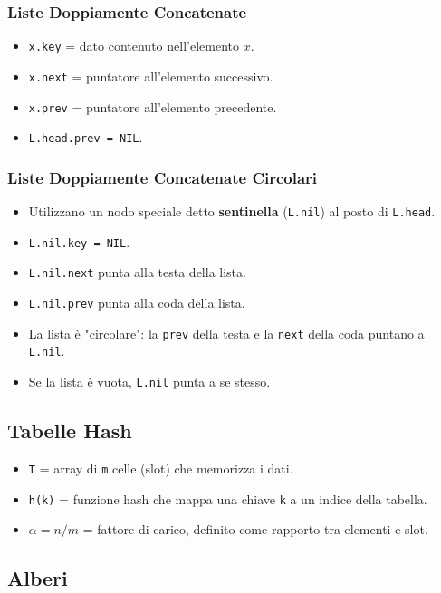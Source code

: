 \subsubsection{Liste Doppiamente Concatenate}
\begin{itemize}
    \item \texttt{x.key} = dato contenuto nell'elemento $x$.
    \item \texttt{x.next} = puntatore all'elemento successivo.
    \item \texttt{x.prev} = puntatore all'elemento precedente.
    \item \texttt{L.head.prev = NIL}.
\end{itemize}

\subsubsection{Liste Doppiamente Concatenate Circolari}
\begin{itemize}
    \item Utilizzano un nodo speciale detto \textbf{sentinella} (\texttt{L.nil}) al posto di \texttt{L.head}.
    \item \texttt{L.nil.key = NIL}.
    \item \texttt{L.nil.next} punta alla testa della lista.
    \item \texttt{L.nil.prev} punta alla coda della lista.
    \item La lista è "circolare": la \texttt{prev} della testa e la \texttt{next} della coda puntano a \texttt{L.nil}.
    \item Se la lista è vuota, \texttt{L.nil} punta a se stesso.
\end{itemize}

\subsection{Tabelle Hash}
\begin{itemize}
    \item \texttt{T} = array di \texttt{m} celle (slot) che memorizza i dati.
    \item \texttt{h(k)} = funzione hash che mappa una chiave \texttt{k} a un indice della tabella.
    \item \texttt{$\alpha=n/m$} = fattore di carico, definito come rapporto tra elementi e slot.
\end{itemize}

\subsection{Alberi}

